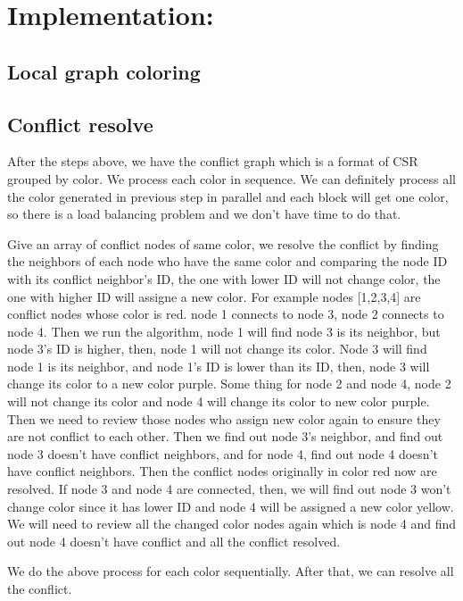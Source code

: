 \documentclass[12pt] {article}
\begin{document}
\section{Implementation:}

\subsection{Local graph coloring}

\subsection{Conflict resolve}
After the steps above, we have the conflict graph which is a format of CSR grouped by color. We process each color in sequence. We can definitely process all the color generated in previous step in parallel and each block will get one color, so there is a load balancing problem and we don't have time to do that. 

Give an array of conflict nodes of same color, we resolve the conflict by finding the neighbors of each node who have the same color and comparing the node ID with its conflict neighbor's ID, the one with lower ID will not change color, the one with higher ID will assigne a new color. For example nodes [1,2,3,4] are conflict nodes whose color is red. node 1 connects to node 3, node 2 connects to node 4. Then we run the algorithm, node 1 will find node 3 is its neighbor, but node 3's ID is higher, then, node 1 will not change its color. Node 3 will find node 1 is its neighbor, and node 1's ID is lower than its ID, then, node 3 will change its color to a new color purple. Some thing for node 2 and node 4, node 2 will not change its color and node 4 will change its color to new color purple. Then we need to review those nodes who assign new color again to ensure they are not conflict to each other. Then we find out node 3's neighbor, and find out node 3 doesn't have conflict neighbors, and for node 4, find out node 4 doesn't have conflict neighbors. Then the conflict nodes originally in color red now are resolved. If node 3 and node 4 are connected, then, we will find out node 3 won't change color since it has lower ID and node 4 will be assigned a new color yellow. We will need to review all the changed color nodes again which is node 4 and find out node 4 doesn't have conflict and all the conflict resolved. 

We do the above process for each color sequentially. After that, we can resolve all the conflict. 
\end{document}
